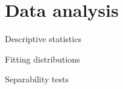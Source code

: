 \documentclass[journal]{IEEEtran}
\begin{document}






\section{Data analysis}

Descriptive statistics

Fitting distributions

Separability tests
\end{document}
